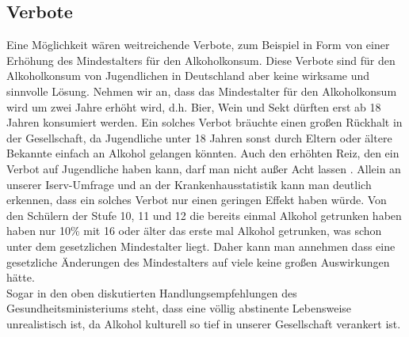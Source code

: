 \documentclass[12pt]{article}
\begin{document}
\subsection{Verbote}
Eine Möglichkeit wären weitreichende Verbote, zum Beispiel in Form von einer Erhöhung des Mindestalters für den Alkoholkonsum. Diese Verbote sind für den Alkoholkonsum von Jugendlichen in Deutschland aber keine wirksame und sinnvolle Lösung. Nehmen wir an, dass das Mindestalter für den Alkoholkonsum wird um zwei Jahre erhöht wird, d.h. Bier, Wein und Sekt dürften erst ab 18 Jahren konsumiert werden. Ein solches Verbot bräuchte einen großen Rückhalt in der Gesellschaft, da Jugendliche unter 18 Jahren sonst durch Eltern oder ältere Bekannte einfach an Alkohol gelangen könnten. Auch den erhöhten Reiz, den ein Verbot auf Jugendliche haben kann, darf man nicht außer Acht lassen \autocite[169]{skala_jugend_2020}. 
Allein an unserer Iserv-Umfrage und an der Krankenhausstatistik kann man deutlich erkennen, dass ein solches Verbot nur einen geringen Effekt haben würde. Von den Schülern der Stufe 10, 11 und 12 die bereits einmal Alkohol getrunken haben haben nur 10\% mit 16 oder älter das erste mal Alkohol getrunken, was schon unter dem gesetzlichen Mindestalter liegt. Daher kann man annehmen dass eine gesetzliche Änderungen des Mindestalters auf viele keine großen Auswirkungen hätte.\\
Sogar in den oben diskutierten Handlungsempfehlungen des Gesundheitsministeriums steht, dass eine völlig abstinente Lebensweise unrealistisch ist, da Alkohol kulturell so tief in unserer Gesellschaft verankert ist.\autocite[24]{kuhn_empfehlungen_nodate}\\
\end{document}
